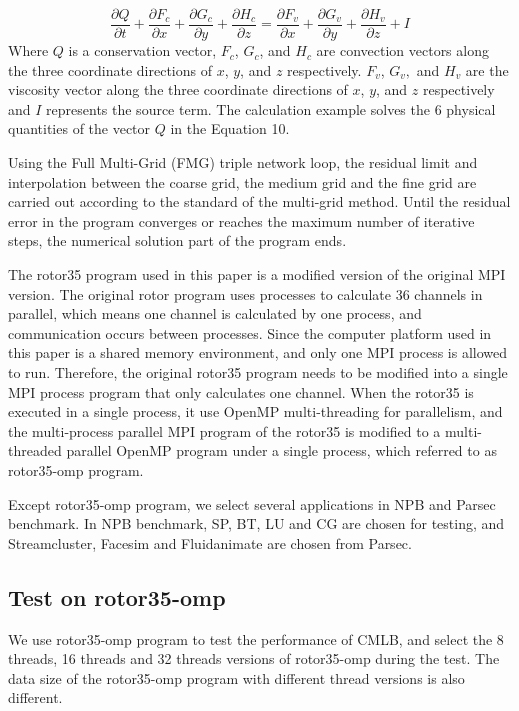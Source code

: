 \documentclass[a4paper,fleqn]{cas-sc}
\begin{document}
\begin{equation} \label{equ10}
	\frac {\partial Q}{\partial t} + \frac {\partial F_c}{\partial x} + \frac {\partial G_c}{\partial y} + \frac {\partial H_c}{\partial z} = \frac {\partial F_v}{\partial x} + \frac {\partial G_v}{\partial y} + \frac {\partial H_v}{\partial z} + I
\end{equation}Where $Q$ is a conservation vector, $F_c$, $G_c$, and $H_c$ are convection vectors along the three coordinate directions of $x$, $y$, and $z$ respectively. $F_v$, $G_v,$ and $H_v$ are the viscosity vector along the three coordinate directions of $x$, $y$, and $z$ respectively and $I$ represents the source term. The calculation example solves the 6 physical quantities of the vector $Q$ in the Equation 10.

Using the Full Multi-Grid (FMG) triple network loop, the residual limit and interpolation between the coarse grid, the medium grid and the fine grid are carried out according to the standard of the multi-grid method. Until the residual error in the program converges or reaches the maximum number of iterative steps, the numerical solution part of the program ends.

The rotor35 program used in this paper is a modified version of the original MPI version. The original rotor program uses processes to calculate 36 channels in parallel, which means one channel is calculated by one process, and communication occurs between processes. Since the computer platform used in this paper is a shared memory environment, and only one MPI process is allowed to run. Therefore, the original rotor35 program needs to be modified into a single MPI process program that only calculates one channel. When the rotor35 is executed in a single process, it use OpenMP multi-threading for parallelism, and the multi-process parallel MPI program of the rotor35 is modified to a multi-threaded parallel OpenMP program under a single process, which referred to as rotor35-omp program. 

Except rotor35-omp program, we select several applications in NPB and Parsec benchmark. In NPB benchmark, SP, BT, LU and CG are chosen for testing, and Streamcluster, Facesim and Fluidanimate are chosen from Parsec.

\subsection{Test on rotor35-omp }

We use rotor35-omp program to test the performance of CMLB,  and select the 8 threads, 16 threads and 32 threads versions of rotor35-omp during the test. The data size of the rotor35-omp program with different thread versions is also different.
\end{document}
